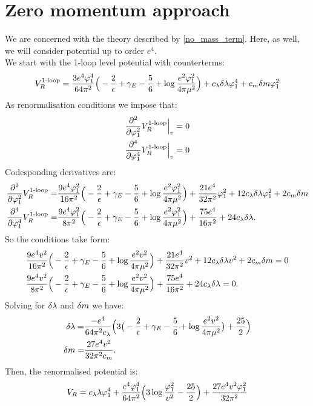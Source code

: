 \section{Zero momentum approach}
We are concerned with the theory described by \ref{no_mass_term}.
Here, as well, we will consider potential up to order $e^4$. \\
We start with the 1-loop level potential with counterterms:
\begin{align}
V_R^{\textrm{1-loop}} = \frac{3e^4\varphi_1^4}{64\pi^2}\Big(-\frac{2}{\epsilon}+\gamma_E-\frac{5}{6}+
\log{\frac{e^2\varphi_1^2}{4\pi\mu^2}}\Big) + c_\lambda\delta\lambda\varphi_1^4+c_m\delta m\varphi_1^2
\end{align}
As renormalisation conditions we impose that:
\begin{align}
\frac{\partial^2 }{\partial \varphi_1^2}V_R^{\textrm{1-loop}}\Big|_{v} &= 0 \\
\frac{\partial^4 }{\partial \varphi_1^4}V_R^{\textrm{1-loop}}\Big|_{v} &= 0
\end{align}
Codesponding derivatives are:
\begin{align}
\frac{\partial^2 }{\partial \varphi_1^2}V_R^{\textrm{1-loop}} = &\frac{9e^4\varphi_1^2}{16\pi^2}\Big(-\frac{2}{\epsilon}+\gamma_E-
\frac{5}{6}+\log{\frac{e^2\varphi_1^2}{4\pi\mu^2}}\Big)+\frac{21e^4}{32\pi^2}\varphi_1^2+ 
12c_\lambda\delta\lambda\varphi_1^2+2c_m\delta m \\
\frac{\partial^4 }{\partial \varphi_1^4}V_R^{\textrm{1-loop}} = &\frac{9e^4\varphi_1^2}{8\pi^2}\Big(-\frac{2}{\epsilon}+\gamma_E-
\frac{5}{6}+\log{\frac{e^2\varphi_1^2}{4\pi\mu^2}}\Big)+\frac{75e^4}{16\pi^2}+24c_\lambda\delta\lambda.
\end{align}
So the conditions take form:
\begin{align}
&\frac{9e^4v^2}{16\pi^2}\Big(-\frac{2}{\epsilon}+\gamma_E-
\frac{5}{6}+\log{\frac{e^2v^2}{4\pi\mu^2}}\Big)+\frac{21e^4}{32\pi^2}v^2+ 
12c_\lambda\delta\lambda v^2+2c_m\delta m = 0\\
&\frac{9e^4v^2}{8\pi^2}\Big(-\frac{2}{\epsilon}+\gamma_E-
\frac{5}{6}+\log{\frac{e^2v^2}{4\pi\mu^2}}\Big)+\frac{75e^4}{16\pi^2}+24c_\lambda\delta\lambda = 0.
\end{align}
Solving for $\delta\lambda$ and $\delta m$ we have:
\begin{align}
\delta\lambda = &\frac{-e^4}{64\pi^2c_\lambda}\Big(3\big(-\frac{2}{\epsilon}+\gamma_E-
\frac{5}{6}+\log\frac{e^2v^2}{4\pi\mu^2}\big)+\frac{25}{2}\Big) \\
\delta m = &\frac{27e^4v^2}{32\pi^2c_m}.
\end{align}
Then, the renormalised potential is:
\begin{align}
V_R = c_\lambda\lambda\varphi_1^4 + \frac{e^4\varphi_1^4}{64\pi^2}\Big(3\log\frac{\varphi_1^2}{v^2}- 
\frac{25}{2}\Big)+
\frac{27e^4v^2\varphi_1^2}{32\pi^2}
\end{align}
